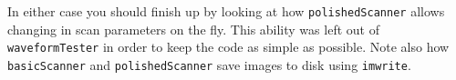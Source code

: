 \documentclass[a4paper]{report}
\begin{document}
In either case you should finish up by looking at how \texttt{polishedScanner} allows changing in scan parameters on the fly. 
This ability was left out of \texttt{waveformTester} in order to keep the code as simple as possible.
Note also how \texttt{basicScanner} and \texttt{polishedScanner} save images to disk using \texttt{imwrite}.
\end{document}

